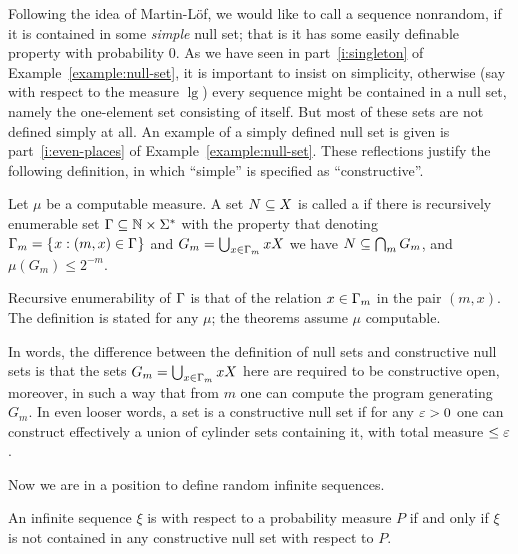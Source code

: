 Following the idea of Martin-L\"of, we would like to call a sequence
nonrandom, if it is contained in some \emph{simple} null set; that is it has
some easily definable property with probability 0.
As we have seen  in part~\ref{i:singleton} of Example~\ref{example:null-set},
it is important to insist on simplicity, otherwise (say
with respect to the measure \( \lg \)) every sequence might be contained in a null set,
namely the one-element set consisting of itself.
But most of these sets are not defined simply at all.
An example of a simply defined null set is given is
part~\ref{i:even-places} of Example~\ref{example:null-set}.
These reflections justify the following definition, in which ``simple'' is
specified as ``constructive''.

\begin{definition}
  \label{def:g2.3.13}
  \leanok
Let \( \mu \) be a computable measure.
A set \( N\subseteq X \) is called a  if there is
recursively enumerable set \( \Gamma\subseteq\mathbb{N}\times\Sigma^{*} \)
with the property that denoting \( \Gamma_{m}=\mathopen\{\mskip 1mu x: (m,x)\in\Gamma\mskip 1mu\mathclose\} \)
and \( G_{m}=\bigcup_{x\in\Gamma_{m}}xX \)
we have \( N\subseteq\bigcap_{m}G_{m} \), and \( \mu(G_{m})\le 2^{-m} \).
\end{definition}

\begin{formalization}
Recursive enumerability of \( \Gamma \) is that of the relation \( x \in \Gamma_{m} \) in the pair
\( (m,x) \). The definition is stated for any \( \mu \); the theorems assume \( \mu \)
computable.
\end{formalization}

In words, the difference between the definition of null sets and constructive
null sets is that the sets \( G_{m}=\bigcup_{x\in\Gamma_{m}}xX \) here
are required to be constructive open, moreover, in such a way that from \( m \) one
can compute the program generating \( G_{m} \).
In even looser words, a set is a constructive null set if for any \( \varepsilon>0 \) one
can construct effectively
a union of cylinder sets containing it, with total measure \( \le\varepsilon \).

Now we are in a position to define random infinite sequences.

\begin{definition}
  \label{def:g2.3.14}
  \leanok
An infinite sequence \( \xi \) is  with respect to a probability measure
\( P \) if and only if \( \xi \) is not contained in any constructive null set with
respect to \( P \).
\end{definition}

